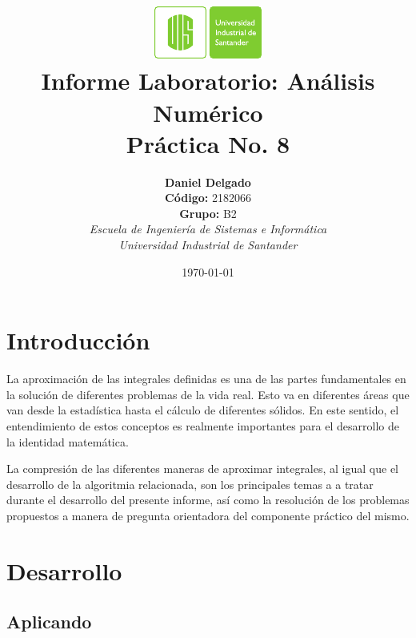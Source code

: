 \documentclass[english,notitlepage,letterpaper, 10pt]{article} %
\newcommand{\university}{\normalsize Universidad Industrial de Santander}
\newcommand{\faculty}{\normalsize  Escuela de Ingenier\'ia de Sistemas e Inform\'atica}
\newcommand{\codigo}{\normalsize  2182066}
\newcommand{\grupo}{\normalsize  B2}
\begin{document}
\title{	\vspace{-12mm}\includegraphics[width=0.2\linewidth]{Logos/UIS.pdf}\\Informe Laboratorio: An\'alisis Num\'erico\\  \centering Pr\'actica No. 8}
\author{
  \textbf{Daniel Delgado} \\ \textbf{C\'odigo:} \codigo\\
  \textbf{Grupo:} \grupo\\
  \textit{\faculty}\\
  \textit{\university}}
\date{\today}
\maketitle

\section{Introducción}

La aproximación de las integrales definidas es una de las partes fundamentales en la solución de diferentes problemas de la vida real. Esto va en diferentes áreas que van desde la estadística hasta el cálculo de diferentes sólidos. En este sentido, el entendimiento de estos conceptos es realmente importantes para el desarrollo de la identidad matemática.

La compresión de las diferentes maneras de aproximar integrales, al igual que el desarrollo de la algoritmia relacionada, son los principales temas a a tratar durante el desarrollo del presente informe, así como la resolución de los problemas propuestos a manera de pregunta orientadora del componente práctico del mismo.

\section{Desarrollo}

\subsection{Aplicando} \label{aplicando}
\end{document}

